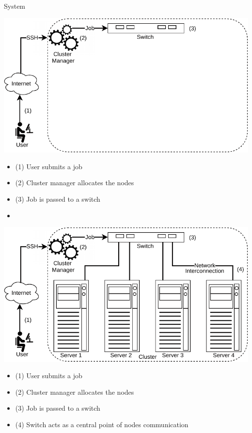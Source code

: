 \documentclass{beamer}
\begin{document}
\begin{frame}{System}
\begin{center}
    \includegraphics[scale=0.65]{SLIDES/img/System3.pdf}
\end{center}    
    \begin{itemize}
    \item (1) User submits a job
    \item (2) Cluster manager allocates the nodes
    \item (3) Job is passed to a switch
    \item[~]
    \end{itemize}
    \framebreak
\begin{center}
    \includegraphics[scale=0.65]{SLIDES/img/System4.pdf}
\end{center}    
    \begin{itemize}
    \item (1) User submits a job
    \item (2) Cluster manager allocates the nodes
    \item (3) Job is passed to a switch
    \item (4) Switch acts as a central point of nodes communication
    \end{itemize}
\end{frame}
\end{document}
